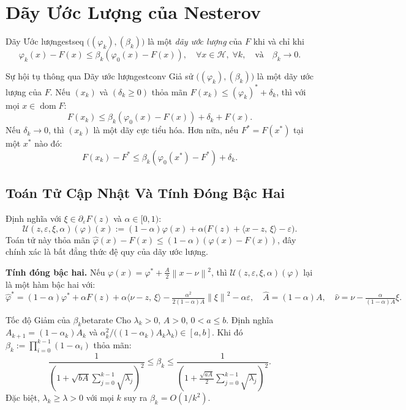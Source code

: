 \documentclass[12pt, a4paper]{article}
\newcommand{\HH}{\mathcal{H}}
\newcommand{\dom}{\operatorname{dom}}
\newcommand{\norm}[1]{\left\|#1\right\|}
\newcommand{\inner}[2]{\langle #1,\,#2\rangle}
\begin{document}
\section{Dãy Ước Lượng của Nesterov}

\begin{definition}{Dãy Ước lượng}{estseq}
$\bigl((\varphi_k),(\beta_k)\bigr)$ là một \emph{dãy ước lượng} của $F$ khi và chỉ khi
\[
  \varphi_k(x)-F(x)\le\beta_k(\varphi_0(x)-F(x)),\quad
  \forall x\in\HH,\;\forall k,\quad
  \text{và}\quad\beta_k\to 0.
\]
\end{definition}


\begin{theorem}{Sự hội tụ thông qua Dãy ước lượng}{estconv}
Giả sử $\bigl((\varphi_k),(\beta_k)\bigr)$ là một dãy ước lượng của $F$.
Nếu $(x_k)$ và $(\delta_k\ge 0)$ thỏa mãn
$F(x_k)\le(\varphi_k)^*+\delta_k$,
thì với mọi $x\in\dom F$:
\[
  F(x_k)\le\beta_k(\varphi_0(x)-F(x))+\delta_k+F(x).
\]
Nếu $\delta_k\to 0$, thì $(x_k)$ là một dãy cực tiểu hóa.
Hơn nữa, nếu $F^*=F(x^*)$ tại một $x^*$ nào đó:
\[
  \boxed{F(x_k)-F^*\le\beta_k(\varphi_0(x^*)-F^*)+\delta_k.}
\]
\end{theorem}

\subsection{Toán Tử Cập Nhật Và Tính Đóng Bậc Hai}

Định nghĩa với $\xi\in\partial_\varepsilon F(z)$ và $\alpha\in[0,1)$:
\[
  \mathcal{U}(z,\varepsilon,\xi,\alpha)(\varphi)(x)
  :=(1-\alpha)\varphi(x)+\alpha\bigl(F(z)+\inner{x-z}{\xi}-\varepsilon\bigr).
\]
Toán tử này thỏa mãn $\widehat\varphi(x)-F(x)\le(1-\alpha)(\varphi(x)-F(x))$,
đây chính xác là bất đẳng thức đệ quy của dãy ước lượng.

\textbf{Tính đóng bậc hai.}
Nếu $\varphi(x)=\varphi^*+\frac{A}{2}\norm{x-\nu}^2$, thì
$\mathcal{U}(z,\varepsilon,\xi,\alpha)(\varphi)$ lại là một hàm bậc hai với:
\begin{equation}\label{eq:quadupdate}
  \hat\varphi^*=(1-\alpha)\varphi^*+\alpha F(z)+\alpha\inner{\nu-z}{\xi}
               -\tfrac{\alpha^2}{2(1-\alpha)A}\norm{\xi}^2-\alpha\varepsilon,
  \quad
  \hat A=(1-\alpha)A,\quad
  \hat\nu=\nu-\tfrac{\alpha}{(1-\alpha)A}\xi.
\end{equation}

\begin{lemma}{Tốc độ Giảm của $\beta_k$}{betarate}
Cho $\lambda_k>0$, $A>0$, $0<a\le b$.
Định nghĩa $A_{k+1}=(1-\alpha_k)A_k$ và
$\alpha_k^2/\bigl((1-\alpha_k)A_k\lambda_k\bigr)\in[a,b]$.
Khi đó $\beta_k:=\prod_{i=0}^{k-1}(1-\alpha_i)$ thỏa mãn:
\[
  \frac{1}{\!\left(1+\sqrt{bA}\sum_{j=0}^{k-1}\sqrt{\lambda_j}\right)^{\!2}}
  \le\beta_k\le
  \frac{1}{\!\left(1+\frac{\sqrt{aA}}{2}\sum_{j=0}^{k-1}\sqrt{\lambda_j}\right)^{\!2}}.
\]
Đặc biệt, $\lambda_k\ge\lambda>0$ với mọi $k$ suy ra $\beta_k=O(1/k^2)$.
\end{lemma}
\end{document}
